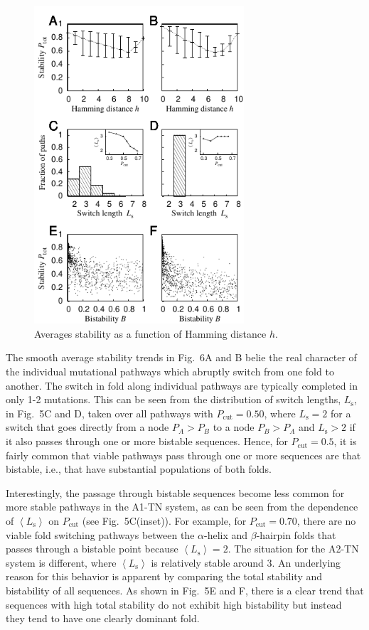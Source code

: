 \documentclass[%
 aip,
rsi,%
 amsmath,amssymb,
 reprint,%
]{revtex4-1}
\newcommand {\Pcut}     	{{P_\mathrm{cut}}}
\begin{document}
\begin{figure}
\includegraphics[width=7.8cm]{Paths}
\caption{Averages stability as a function of Hamming distance $h$. }
\end{figure}


The smooth average stability trends in Fig.~6A and B belie the real character of the individual mutational pathways which abruptly switch from one fold to another. The switch in fold along individual pathways are typically completed in only 1-2 mutations. This can be seen from the distribution of switch lengths, $L_\mathrm{s}$, in Fig.~5C and D, taken over all pathways with $\Pcut=0.50$, where  $L_\mathrm{s} = 2$ for a switch that goes directly from a node $P_A>P_B$ to a node $P_B>P_A$ and $L_\mathrm{s} > 2$ if it also passes through one or more bistable sequences. Hence, for $\Pcut = 0.5$, it is fairly common that viable pathways pass through one or more sequences are that bistable, i.e., that have substantial populations of both folds. 

Interestingly, the passage through bistable sequences become less common for more stable pathways in the A1-TN system, as can be seen from the dependence of $\left <L_\mathrm{s}\right >$ on $\Pcut$ (see Fig.~5C(inset)). For example, for $\Pcut=0.70$, there are no viable fold switching pathways between the $\alpha$-helix and $\beta$-hairpin folds that passes through a bistable point because $\left <L_\mathrm{s}\right > =  2$. The situation for the A2-TN system is different, where $\left <L_\mathrm{s}\right >$ is relatively stable around 3. An underlying reason for this behavior is apparent by comparing the total stability and bistability of all sequences. As shown in Fig.~5E and F, there is a clear trend that sequences with high total stability do not exhibit high bistability but instead they tend to have one clearly dominant fold.
\end{document}
